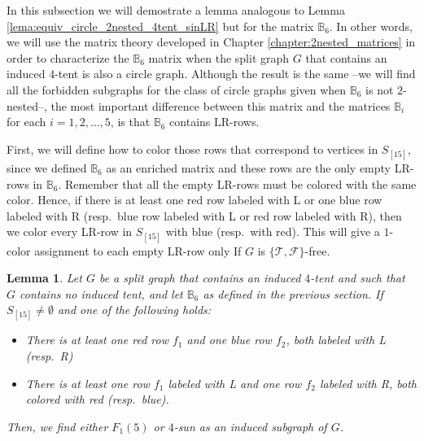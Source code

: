 \documentclass[12pt]{book}
\theoremstyle{plain}
\newtheorem{lema}[teo]{Lemma}
\theoremstyle{remark}
\begin{document}
In this subsection we will demostrate a lemma analogous to Lemma \ref{lema:equiv_circle_2nested_4tent_sinLR} but for the matrix $\mathbb B_6$. In other words, we will use the matrix theory developed in Chapter \ref{chapter:2nested_matrices} in order to characterize the $\mathbb B_6$ matrix when the split graph $G$ that contains an induced $4$-tent is also a circle graph. Although the result is the same --we will find all the forbidden subgraphs for the class of circle graphs given when $\mathbb B_6$ is not $2$-nested--, the most important difference between this matrix and the matrices $\mathbb B_i$ for each $i=1, 2, \ldots, 5$, is that $\mathbb B_6$ contains LR-rows. 

First, we will define how to color those rows that correspond to vertices in $S_{[15]}$, since we defined $\mathbb B_6$ as an enriched matrix and these rows are the only empty LR-rows in $\mathbb B_6$.
Remember that all the empty LR-rows must be colored with the same color. Hence, if there is at least one red row labeled with L or one blue row labeled with R (resp.\ blue row labeled with L or red row labeled with R), then we color every LR-row in $S_{[15]}$ with blue (resp.\ with red).
This will give a $1$-color assignment to each empty LR-row only If $G$ is $\{ \mathcal{T}, \mathcal{F} \}$-free.

\begin{lema} \label{lema:4tent_coloreoLRvacias}
	Let $G$ be a split graph that contains an induced $4$-tent and such that $G$ contains no induced tent, and let $\mathbb B_6$ as defined in the previous section. If $S_{[15]} \neq \emptyset$ and one of the following holds:
	\begin{itemize}
	\item There is at least one red row $f_1$ and one blue row $f_2$, both labeled with L (resp.\ R)
	\item There is at least one row $f_1$ labeled with L and one row $f_2$ labeled with R, both colored with red (resp.\ blue).
	\end{itemize}
Then, we find either $F_1(5)$ or $4$-sun as an induced subgraph of $G$.
\end{lema}
\end{document}
